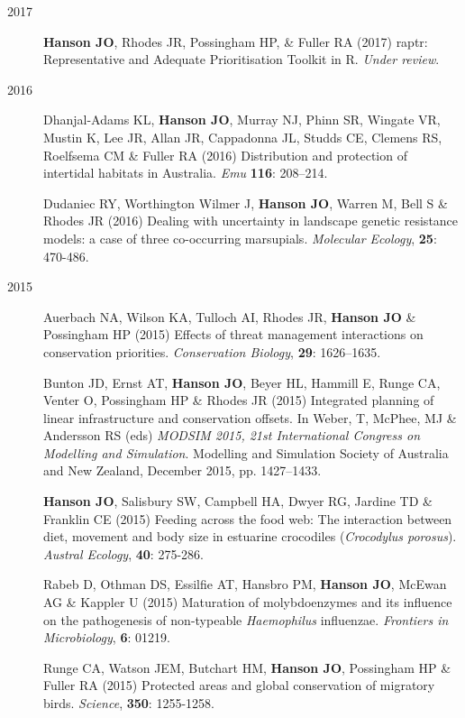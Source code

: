 \documentclass[12pt,a4paper]{article}
\begin{document}
\begin{description}

\item[2017] \textbf{Hanson JO}, Rhodes JR, Possingham HP, \& Fuller RA (2017) raptr: Representative and Adequate Prioritisation Toolkit in R. \textit{Under review}.

\item[2016] Dhanjal-Adams KL, \textbf{Hanson JO}, Murray NJ, Phinn SR, Wingate VR, Mustin K, Lee JR, Allan JR, Cappadonna JL, Studds CE, Clemens RS, Roelfsema CM \& Fuller RA (2016) Distribution and protection of intertidal habitats in Australia. \textit{Emu} \textbf{116}: 208--214.

\item[] Dudaniec RY, Worthington Wilmer J, \textbf{Hanson JO}, Warren M, Bell S \& Rhodes JR (2016) Dealing with uncertainty in landscape genetic resistance models: a case of three co-occurring marsupials. \textit{Molecular Ecology}, \textbf{25}: 470-486.

\item[2015] Auerbach NA, Wilson KA, Tulloch AI, Rhodes JR, \textbf{Hanson JO} \& Possingham HP (2015) Effects of threat management interactions on conservation priorities. \textit{Conservation Biology}, \textbf{29}: 1626--1635.

\item[] Bunton JD, Ernst AT, \textbf{Hanson JO}, Beyer HL, Hammill E, Runge CA, Venter O, Possingham HP \& Rhodes JR (2015) Integrated planning of linear infrastructure and conservation offsets. In Weber, T, McPhee, MJ \& Andersson RS (eds) \textit{MODSIM 2015, 21st International Congress on Modelling and Simulation}. Modelling and Simulation Society of Australia and New Zealand, December 2015, pp. 1427--1433.

\item[] \textbf{Hanson JO}, Salisbury SW, Campbell HA, Dwyer RG, Jardine TD \& Franklin CE (2015) Feeding across the food web: The interaction between diet, movement and body size in estuarine crocodiles (\textit{Crocodylus porosus}). \textit{Austral Ecology}, \textbf{40}: 275-286.

\item[] Rabeb D, Othman DS, Essilfie AT, Hansbro PM, \textbf{Hanson JO}, McEwan AG \& Kappler U (2015) Maturation of molybdoenzymes and its influence on the pathogenesis of non-typeable \textit{Haemophilus} influenzae. \textit{Frontiers in Microbiology}, \textbf{6}: 01219.

\item[] Runge CA, Watson JEM, Butchart HM, \textbf{Hanson JO}, Possingham HP \& Fuller RA (2015) Protected areas and global conservation of migratory birds. \textit{Science}, \textbf{350}: 1255-1258.

\end{description}
\end{document}
